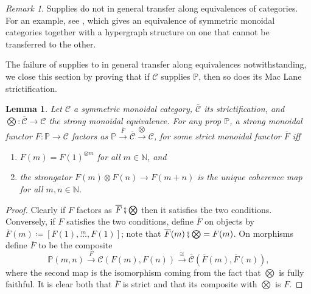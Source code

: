 \documentclass[11pt, oneside, article]{memoir}
\theoremstyle{plain}
\newtheorem{lemma}[theorem]{Lemma}
\theoremstyle{definition}
\theoremstyle{remark}
\newtheorem{remark}[theorem]{Remark}
\newcommand{\cat}[1]{\mathcal{#1}}%
\newcommand{\tpow}[1]{^{\otimes #1}}
\newcommand{\strict}[1]{\overline{#1}}
\newcommand{\nn}{\mathbb{N}}
\newcommand{\pp}{\mathbb{P}}
\newcommand{\Ldots}[1]{\overset{#1}{\ldots}}
\newcommand{\cp}{\mathbin{\fatsemi}}
\newcommand{\To}[1]{\xrightarrow{#1}}
\begin{document}
\begin{remark}
  Supplies do not in general transfer along equivalences of categories. For an example, see \cite[Example 2.20]{fong2019hypergraph}, which gives an equivalence of symmetric monoidal categories together with a hypergraph structure on one that cannot be transferred to the other.
\end{remark}

The failure of supplies to in general transfer along equivalences notwithstanding, we close this section by proving that if $\cat{C}$ supplies $\pp$, then so does its Mac Lane strictification.

\begin{lemma}\label{lemma.strictification}
Let $\cat{C}$ a symmetric monoidal category, $\strict{\cat{C}}$ its strictification, and $\bigotimes\colon\strict{\cat{C}}\to\cat{C}$ the strong monoidal equivalence. For any prop $\pp$, a strong monoidal functor $F\colon\pp\to\cat{C}$ factors as $\pp\To{\strict{F}}\strict{\cat{C}}\To{\bigotimes}\cat{C}$, for some strict monoidal functor $\strict{F}$ iff
\begin{enumerate}[label=(\roman*)]
	\item $F(m)=F(1)\tpow{m}$ for all $m\in\nn$, and
	\item the strongator $F(m)\otimes F(n)\to F(m+n)$ is the unique coherence map for all $m,n \in \nn$.
\end{enumerate}
\end{lemma}
\begin{proof}
Clearly if $F$ factors as $\strict{F}\cp\bigotimes$ then it satisfies the two conditions. Conversely, if $F$ satisfies the two conditions, define $\strict{F}$ on objects by $\strict{F}(m)\coloneqq[F(1),\Ldots{m},F(1)]$; note that $\strict{F}(m)\cp\bigotimes=F(m)$. On morphisms define $\strict{F}$ to be the composite
\[\pp(m,n)\To{F}\cat{C}(F(m),F(n))\To{\cong}\strict{\cat{C}}(\strict{F}(m),\strict{F}(n)),\]
where the second map is the isomorphism coming from the fact that $\bigotimes$ is fully faithful. It is clear both that $\strict{F}$ is strict and that its composite with $\bigotimes$ is $F$.
\end{proof}
\end{document}
